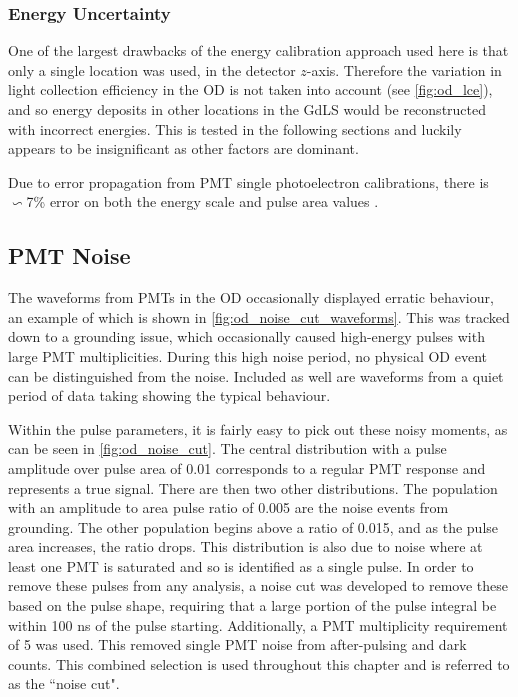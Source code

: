 \subsubsection{Energy Uncertainty}
\par
One of the largest drawbacks of the energy calibration approach used here is that only a single location was used, in the detector $z$-axis.
Therefore the variation in light collection efficiency in the OD is not taken into account (see \autoref{fig:od_lce}), and so energy deposits in other locations in the GdLS would be reconstructed with incorrect energies.
This is tested in the following sections and luckily appears to be insignificant as other factors are dominant.
\par
Due to error propagation from PMT single photoelectron calibrations, there is $\backsim$7\% error on both the energy scale and pulse area values \cite{ewanfraser_thesis_ref}.


\subsection{PMT Noise}
\par
The waveforms from PMTs in the OD occasionally displayed erratic behaviour, an example of which is shown in \autoref{fig:od_noise_cut_waveforms}.
This was tracked down to a grounding issue, which occasionally caused high-energy pulses with large PMT multiplicities.
During this high noise period, no physical OD event can be distinguished from the noise.
Included as well are waveforms from a quiet period of data taking showing the typical behaviour.
\par
Within the pulse parameters, it is fairly easy to pick out these noisy moments, as can be seen in \autoref{fig:od_noise_cut}.
The central distribution with a pulse amplitude over pulse area of 0.01 corresponds to a regular PMT response and represents a true signal.
There are then two other distributions.
The population with an amplitude to area pulse ratio of 0.005 are the noise events from grounding.
The other population begins above a ratio of 0.015, and as the pulse area increases, the ratio drops.
This distribution is also due to noise where at least one PMT is saturated and so is identified as a single pulse.
In order to remove these pulses from any analysis, a noise cut was developed to remove these based on the pulse shape, requiring that a large portion of the pulse integral be within 100 ns of the pulse starting.
Additionally, a PMT multiplicity requirement of 5 was used.
This removed single PMT noise from after-pulsing and dark counts.
This combined selection is used throughout this chapter and is referred to as the ``noise cut".


